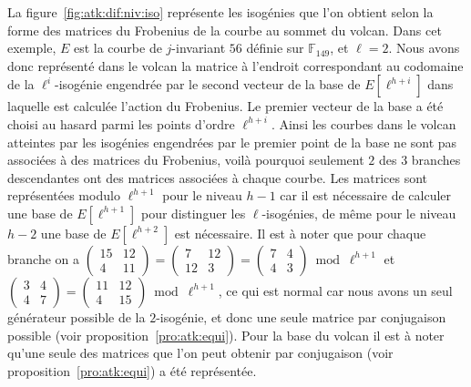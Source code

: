 \documentclass[10pt,a4paper]{book}
\theoremstyle{plain}
\theoremstyle{definition}
\theoremstyle{definition}
\theoremstyle{definition}
\theoremstyle{definition}
\theoremstyle{definition}
\theoremstyle{remark}
\theoremstyle{remark}
\theoremstyle{definition}
\begin{document}
La figure~\ref{fig:atk:dif:niv:iso} représente les isogénies que l'on obtient 
selon la forme des matrices du Frobenius de la 
courbe au sommet du volcan. Dans cet exemple, $E$ est la courbe de 
$j$-invariant $56$ définie sur $\mathbb{F}_{149}$, et $\ell=2$. Nous avons donc 
représenté dans le volcan la 
matrice à l'endroit correspondant au codomaine de la $\ell^{i}$-isogénie 
engendrée par le second vecteur de la base de $E[\ell^{h+i}]$ dans laquelle est
calculée l'action du Frobenius. Le premier vecteur de la base a été choisi au 
hasard parmi les points d'ordre $\ell^{h+i}$.  Ainsi les courbes dans le volcan
atteintes par les isogénies engendrées par le premier point de la base ne sont 
pas associées à des matrices du Frobenius, voilà pourquoi seulement $2$ des $3$ 
branches descendantes ont des matrices associées à chaque courbe. Les matrices 
sont représentées modulo $\ell^{h+1}$ pour le niveau $h-1$ car il est 
nécessaire de calculer une base de $E[\ell^{h+1}]$ pour distinguer les 
$\ell$-isogénies, de même pour le niveau $h-2$ une base de $E[\ell^{h+2}]$ est 
nécessaire. Il est à noter que pour chaque branche on a $\left( 
\begin{smallmatrix}15 & 12 \\4  & 11 \end{smallmatrix} \right) = \left( 
\begin{smallmatrix}7 & 12 \\12  & 3 \end{smallmatrix} \right) = \left( 
\begin{smallmatrix}7 & 4 \\4  & 3 \end{smallmatrix} \right) \bmod \ell^{h+1}$ 
et $\left( \begin{smallmatrix}3 & 4 \\4  & 7 \end{smallmatrix} \right)  = 
\left( \begin{smallmatrix}11 & 12 \\4 & 15 \end{smallmatrix} \right) \bmod 
\ell^{h+1}$, ce qui est normal car nous avons un seul générateur possible de 
la $2$-isogénie, et donc une seule matrice par conjugaison possible (voir 
proposition~\ref{pro:atk:equi}). Pour la base du volcan il est à 
noter qu'une seule des matrices que l'on peut obtenir par conjugaison (voir 
proposition~\ref{pro:atk:equi}) a été représentée.
\end{document}
